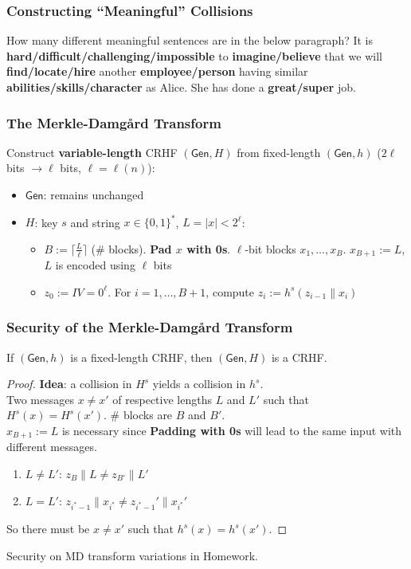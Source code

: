 \begin{frame}\frametitle{Constructing ``Meaningful'' Collisions}
\begin{exampleblock}{How many different meaningful sentences are in the below paragraph?}
It is \textbf{hard/difficult/challenging/impossible} to \textbf{imagine/believe} that we will \textbf{find/locate/hire} another \textbf{employee/person} having similar \textbf{abilities/skills/character} as Alice. She has done a \textbf{great/super} job.
\end{exampleblock}
\end{frame}
\begin{frame}\frametitle{The Merkle-Damg\r{a}rd Transform}
\begin{figure}
\begin{center}

\end{center}
\end{figure}
\begin{construction}
Construct \textbf{variable-length} CRHF $(\mathsf{Gen}, H)$ from fixed-length $(\mathsf{Gen}, h)$ ($2\ell$ bits $\to \ell$ bits, $\ell = \ell(n)$):
\begin{itemize}
\item $\mathsf{Gen}$: remains unchanged
\item $H$: key $s$ and string $x \in \{0,1\}^*$, $L=|x|< 2^{\ell}$:
\begin{itemize}
\item $B := \lceil \frac{L}{\ell} \rceil$ (\# blocks). \textbf{Pad $x$ with 0s}.  $\ell$-bit blocks $x_1,\dotsc,x_B$. $x_{B+1} := L$, $L$ is encoded using $\ell$ bits
\item $z_0 := IV = 0^\ell$. For $i=1,\dotsc,B+1$, compute $z_i := h^s(z_{i-1}\| x_i)$
\end{itemize}
\end{itemize}
\end{construction}
\end{frame}
\begin{frame}\frametitle{Security of the Merkle-Damg\r{a}rd Transform}
\begin{theorem}
If $(\mathsf{Gen},h)$ is a fixed-length CRHF, then $(\mathsf{Gen},H)$ is a CRHF.
\end{theorem}
\begin{proof}
\textbf{Idea}: a collision in $H^s$ yields a collision in $h^s$. \\
Two messages $x \ne x'$ of respective lengths $L$ and $L'$ such that $H^s(x) = H^s(x')$. \# blocks are $B$ and $B'$. \\
$x_{B+1} := L$ is necessary since \textbf{Padding with 0s} will lead to the same input with different messages.
\begin{enumerate}
\item $L \ne L'$: $z_B\| L \ne z_{B'}\| L'$
\item $L = L'$: $z_{i^*-1}\| x_{i^*} \ne z_{i^*-1}'\| x_{i^*}'$
\end{enumerate}
So there must be $x \neq x'$ such that $h^s(x) = h^s(x')$.
\end{proof}
Security on MD transform variations in Homework.
\end{frame}
